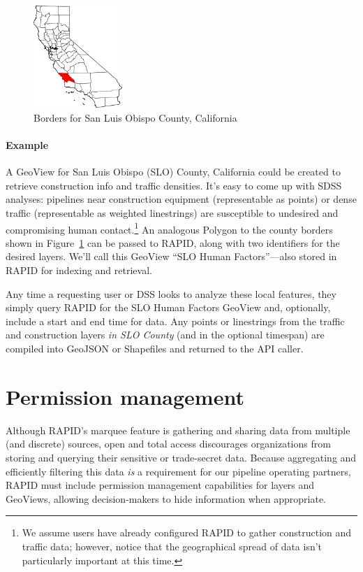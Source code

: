 \begin{figure}
    \centering

    \includegraphics[width=0.3\textwidth]{figures/slo_county.png}
    
    \caption{Borders for San Luis Obispo County, California}
    \label{fig:county}
    
\end{figure}

\paragraph{Example}
A GeoView for San Luis Obispo (SLO) County, California could be created to retrieve construction info and traffic densities. It's easy to come up with SDSS analyses: pipelines near construction equipment (representable as points) or dense traffic (representable as weighted linestrings) are susceptible to undesired and compromising human contact.\footnote{We assume users have already configured RAPID to gather construction and traffic data; however, notice that the geographical spread of data isn't particularly important at this time.} An analogous Polygon to the county borders shown in Figure~\ref{fig:county} can be passed to RAPID, along with two identifiers for the desired layers. We'll call this GeoView ``SLO Human Factors''---also stored in RAPID for indexing and retrieval.

Any time a requesting user or DSS looks to analyze these local features, they simply query RAPID for the SLO Human Factors GeoView and, optionally, include a start and end time for data. Any points or linestrings from the traffic and construction layers \textit{in SLO County} (and in the optional timespan) are compiled into GeoJSON or Shapefiles and returned to the API caller.

\section{Permission management}
Although RAPID's marquee feature is gathering and sharing data from multiple (and discrete) sources, open and total access discourages organizations from storing and querying their sensitive or trade-secret data. Because aggregating and efficiently filtering this data \textit{is} a requirement for our pipeline operating partners, RAPID must include permission management capabilities for layers and GeoViews, allowing decision-makers to hide information when appropriate.

